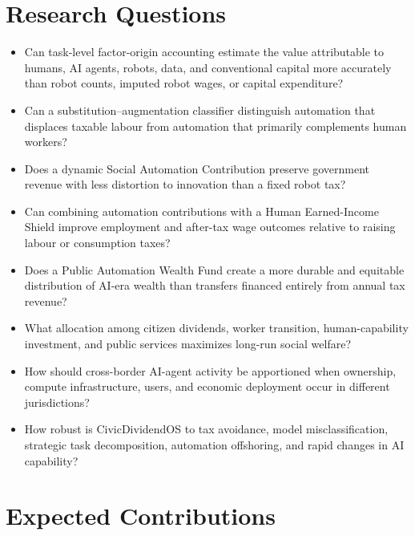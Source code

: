 \documentclass[conference]{IEEEtran}
\begin{document}
\section{Research Questions}

\begin{itemize}

\item[\textbf{RQ1}] Can task-level factor-origin accounting estimate the value
attributable to humans, AI agents, robots, data, and conventional capital more
accurately than robot counts, imputed robot wages, or capital expenditure?

\item[\textbf{RQ2}] Can a substitution--augmentation classifier distinguish
automation that displaces taxable labour from automation that primarily
complements human workers?

\item[\textbf{RQ3}] Does a dynamic Social Automation Contribution preserve
government revenue with less distortion to innovation than a fixed robot tax?

\item[\textbf{RQ4}] Can combining automation contributions with a Human
Earned-Income Shield improve employment and after-tax wage outcomes relative to
raising labour or consumption taxes?

\item[\textbf{RQ5}] Does a Public Automation Wealth Fund create a more durable
and equitable distribution of AI-era wealth than transfers financed entirely
from annual tax revenue?

\item[\textbf{RQ6}] What allocation among citizen dividends, worker transition,
human-capability investment, and public services maximizes long-run social
welfare?

\item[\textbf{RQ7}] How should cross-border AI-agent activity be apportioned
when ownership, compute infrastructure, users, and economic deployment occur in
different jurisdictions?

\item[\textbf{RQ8}] How robust is CivicDividendOS to tax avoidance, model
misclassification, strategic task decomposition, automation offshoring, and
rapid changes in AI capability?

\end{itemize}

\section{Expected Contributions}
\end{document}
